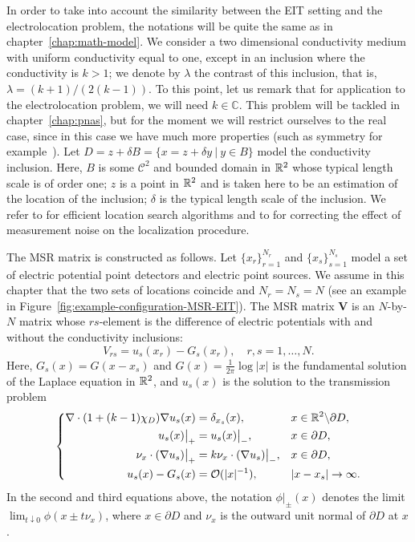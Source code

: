 In order to take into account the similarity between the EIT setting and the
electrolocation problem, the notations will be quite the same as in chapter~\ref{chap:math-model}. 
We consider a two dimensional conductivity medium with uniform
conductivity equal to one, except in an inclusion where the
conductivity is $k
> 1$; we denote by $\lambda$ the contrast of this inclusion, that
is,  $\lambda = (k + 1)/(2(k - 1))$. To this point, let us remark that for
application to the electrolocation problem, we will need $k \in \mathbb{C}$. This
problem will be tackled in chapter~\ref{chap:pnas}, but for the moment we will restrict
ourselves to the real case, since in this case we have much more properties
(such as symmetry for example~\cite{ammari2007polarization}).
Let $D = z + \delta
B = \{ x = z + \delta y ~|~ y \in B\}$ model the conductivity
inclusion.  Here, $B$ is some $\mathcal{C}^2$ and bounded domain
in $\R^2$ whose typical length scale is of order one; $z$ is a
point in $\R^2$ and is taken here to be an estimation of the
location of the inclusion; $\delta$ is the typical length scale of
the inclusion. We refer to \cite{ammari2004reconstruction} for efficient location
search algorithms and to \cite{AGJ} for correcting the effect of
measurement noise on the localization procedure.

The MSR matrix is constructed as follows. Let
$\{x_r\}_{r=1}^{N_r}$ and $\{x_s\}_{s=1}^{N_s}$ model a set of
electric potential point detectors and electric point sources. We
assume in this chapter that the two sets of locations coincide and
$N_r = N_s = N$ (see an example in Figure~\ref{fig:example-configuration-MSR-EIT}).
The MSR matrix $\mathbf{V}$ is an $N$-by-$N$
matrix whose $rs$-element is the difference of electric potentials
with and without the conductivity inclusions:
\begin{equation}
V_{rs} = u_s(x_r) - G_s(x_r), \quad r, s = 1, \ldots, N.
\end{equation}
Here, $G_s (x) = G(x-x_s)$ and $G(x) =
\frac{1}{2\pi} \log |x|$ is the fundamental solution of the
Laplace equation in $\R^2$, and $u_s(x)$ is the solution to the
transmission problem
\begin{equation}
\left\{
\begin{aligned}
\nabla \cdot (1 + (k-1) \chi_{D}) \nabla u_s(x) &= \delta_{x_s}(x),  & & x \in \R^2 \backslash \partial D,\\
u_s (x) \big|_{+} &= u_s (x) \big|_{-}, & & x \in \partial D,\\
\nu_x \cdot (\nabla u_s) \big|_{+} &= k \nu_x \cdot (\nabla u_s) \big|_{-}, & & x \in \partial D,\\
u_s(x) - G_s (x) & = \mathcal{O}(|x|^{-1}), & & |x-x_s| \to
\infty.
\end{aligned}
\right. \label{eq:transm}
\end{equation}
In the second and third equations above, the notation
$\phi\big|_{\pm}(x)$ denotes the limit $\lim_{t \downarrow 0}
\phi(x\pm t\nu_x)$, where $x \in \partial D$ and $\nu_x$ is the
outward unit normal of $\partial D$ at $x$.

